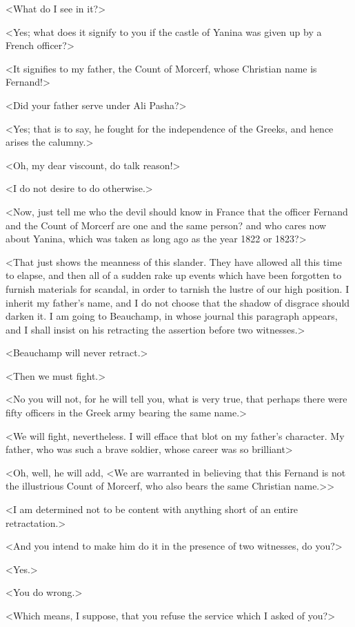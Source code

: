  <What do I see in it?> 

 <Yes; what does it signify to you if the castle of Yanina was given up by a French officer?> 

 <It signifies to my father, the Count of Morcerf, whose Christian name is Fernand!> 

 <Did your father serve under Ali Pasha?> 

 <Yes; that is to say, he fought for the independence of the Greeks, and hence arises the calumny.> 

 <Oh, my dear viscount, do talk reason!> 

 <I do not desire to do otherwise.> 

 <Now, just tell me who the devil should know in France that the officer Fernand and the Count of Morcerf are one and the same person? and who cares now about Yanina, which was taken as long ago as the year 1822 or 1823?> 

 <That just shows the meanness of this slander. They have allowed all this time to elapse, and then all of a sudden rake up events which have been forgotten to furnish materials for scandal, in order to tarnish the lustre of our high position. I inherit my father's name, and I do not choose that the shadow of disgrace should darken it. I am going to Beauchamp, in whose journal this paragraph appears, and I shall insist on his retracting the assertion before two witnesses.> 

 <Beauchamp will never retract.> 

 <Then we must fight.> 

 <No you will not, for he will tell you, what is very true, that perhaps there were fifty officers in the Greek army bearing the same name.> 

 <We will fight, nevertheless. I will efface that blot on my father's character. My father, who was such a brave soldier, whose career was so brilliant\longdash> 

 <Oh, well, he will add, <We are warranted in believing that this Fernand is not the illustrious Count of Morcerf, who also bears the same Christian name.>> 

 <I am determined not to be content with anything short of an entire retractation.> 

 <And you intend to make him do it in the presence of two witnesses, do you?> 

 <Yes.> 

 <You do wrong.> 

 <Which means, I suppose, that you refuse the service which I asked of you?> 

